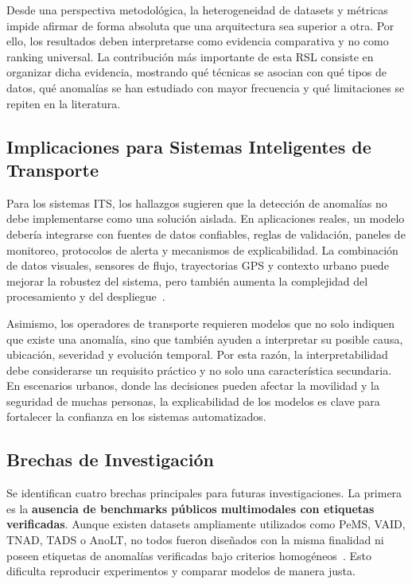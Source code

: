 \documentclass[12pt, a4paper]{article}
\begin{document}
Desde una perspectiva metodol\'{o}gica, la heterogeneidad de datasets y m\'{e}tricas impide afirmar de forma absoluta que una arquitectura sea superior a otra. Por ello, los resultados deben interpretarse como evidencia comparativa y no como ranking universal. La contribuci\'{o}n m\'{a}s importante de esta RSL consiste en organizar dicha evidencia, mostrando qu\'{e} t\'{e}cnicas se asocian con qu\'{e} tipos de datos, qu\'{e} anomal\'{i}as se han estudiado con mayor frecuencia y qu\'{e} limitaciones se repiten en la literatura.

\subsection{Implicaciones para Sistemas Inteligentes de Transporte}

Para los sistemas ITS, los hallazgos sugieren que la detecci\'{o}n de anomal\'{i}as no debe implementarse como una soluci\'{o}n aislada. En aplicaciones reales, un modelo deber\'{i}a integrarse con fuentes de datos confiables, reglas de validaci\'{o}n, paneles de monitoreo, protocolos de alerta y mecanismos de explicabilidad. La combinaci\'{o}n de datos visuales, sensores de flujo, trayectorias GPS y contexto urbano puede mejorar la robustez del sistema, pero tambi\'{e}n aumenta la complejidad del procesamiento y del despliegue~\cite{abdallah2025aipurban,duan2025multimodal}.

Asimismo, los operadores de transporte requieren modelos que no solo indiquen que existe una anomal\'{i}a, sino que tambi\'{e}n ayuden a interpretar su posible causa, ubicaci\'{o}n, severidad y evoluci\'{o}n temporal. Por esta raz\'{o}n, la interpretabilidad debe considerarse un requisito pr\'{a}ctico y no solo una caracter\'{i}stica secundaria. En escenarios urbanos, donde las decisiones pueden afectar la movilidad y la seguridad de muchas personas, la explicabilidad de los modelos es clave para fortalecer la confianza en los sistemas automatizados.

\subsection{Brechas de Investigaci\'{o}n}

Se identifican cuatro brechas principales para futuras investigaciones. La primera es la \textbf{ausencia de benchmarks p\'{u}blicos multimodales con etiquetas verificadas}. Aunque existen datasets ampliamente utilizados como PeMS, VAID, TNAD, TADS o AnoLT, no todos fueron dise\~{n}ados con la misma finalidad ni poseen etiquetas de anomal\'{i}as verificadas bajo criterios homog\'{e}neos~\cite{taheri2026applicability,khan2022anomaly,huang2020intelligent}. Esto dificulta reproducir experimentos y comparar modelos de manera justa.
\end{document}

